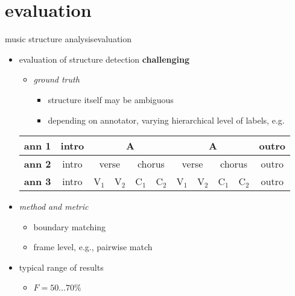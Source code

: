     \section[eval]{evaluation}
        \begin{frame}{music structure analysis}{evaluation}
            \begin{itemize}
                \item   evaluation of structure detection \textbf{challenging}
                    \begin{itemize}
                        \item   \textit{ground truth}
                            \begin{itemize}
                                \item   structure itself may be ambiguous
                                \item   depending on annotator, varying hierarchical level of labels, e.g.
                            \end{itemize}
                    \end{itemize}
                    \begin{table}
                        \centering
                        \footnotesize
                            \begin{tabular}{l|c|c|c|c|c|c|c|c|c|c|}
                                    \hline
                                  \textbf{ann 1} & intro & \multicolumn{4}{c|}{A} & \multicolumn{4}{c|}{A} & outro\\ \hline
                                  \textbf{ann 2} & intro & \multicolumn{2}{c|}{verse} & \multicolumn{2}{c|}{chorus} & \multicolumn{2}{c|}{verse} & \multicolumn{2}{c|}{chorus} & outro\\ \hline
                                  \textbf{ann 3} & intro & V$_1$ & V$_2$ & C$_1$ &C$_2$ &  V$_1$ & V$_2$ & C$_1$ &C$_2$ & outro\\
                                    \hline
                            \end{tabular}
                    \end{table}
                \bigskip
                \item<2->   \textit{method and metric}
                    \begin{itemize}
                        \item   boundary matching
                        \item   frame level, e.g., pairwise match
                    \end{itemize}
                \bigskip
                \item<3->   typical range of results
                    \begin{itemize}
                        \item   $F = 50\ldots 70\% $
                    \end{itemize}
            \end{itemize}
        \end{frame}
    
